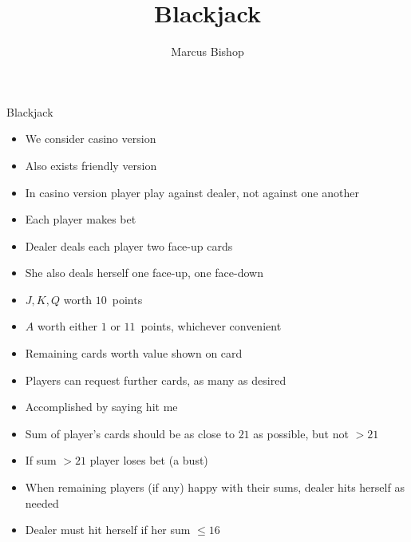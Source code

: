 \documentclass{beamer}
\title[Blackjack]{Blackjack}
\author{Marcus Bishop}
\theoremstyle{definition}
\begin{document}
\begin{frame}\titlepage\end{frame}
\LogoOff

\begin{frame}{Blackjack}
\begin{itemize}
\item We consider casino version
\item Also exists friendly version
\item In casino version player play against dealer, not against one another
\item Each player makes bet
\item Dealer deals each player two face-up cards
\item She also deals herself one face-up, one face-down
\item $J,K,Q$ worth $10$~points
\item $A$ worth either $1$ or $11$~points, whichever convenient
\item Remaining cards worth value shown on card
\item Players can request further cards, as many as desired
\item Accomplished by saying \alert{hit me}
\item Sum of player's cards should be as close to $21$ as possible,
but not $>21$
\item If sum $>21$ player loses bet (a \alert{bust})
\end{itemize}
\end{frame}

\begin{frame}
\begin{itemize}
\item When remaining players (if any) happy with their sums,
dealer hits herself as needed
\item Dealer \alert{must} hit herself if her sum $\le 16$
\item However, she must stop hitting herself when her sum $\ge 17$
\item If her sum $>21$ (she \alert{busts}), player wins amount bet
\item Suppose her sum $\le 21$
\item If her sum closer to $21$ than player's sum,
player loses bet
\item If player's sum closer to $21$ than dealer's sum,
player wins amount bet
\item \dots unless player's sum $21$ (a \alert{blackjack}
\item Then player wins $\frac{3}{2}$ amount bet
\item If dealer's sum equals player's sum, no money exchanged
\end{itemize}
\end{frame}
\end{document}
